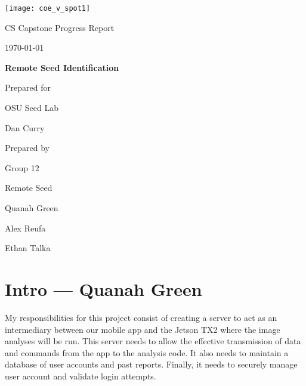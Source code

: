 \documentclass[onecolumn, draftclsnofoot,10pt, compsoc]{IEEEtran}
\def \CapstoneTeamName{		Remote Seed}
\def \CapstoneTeamNumber{		12}
\def \GroupMemberOne{			Quanah Green}
\def \GroupMemberTwo{			Alex Reufa}
\def \GroupMemberThree{			Ethan Talka}
\def \CapstoneProjectName{		Remote Seed Identification}
\def \CapstoneSponsorCompany{	OSU Seed Lab}
\def \CapstoneSponsorPerson{		Dan Curry}
\def \DocType{		%
				Progress Report
				}
\newcommand{\NameSigPair}[1]{\par
\makebox[2.75in][r]{#1} \hfil 	\makebox[3.25in]{\makebox[2.25in]{\hrulefill} \hfill		\makebox[.75in]{\hrulefill}}
\par\vspace{-12pt} \textit{\tiny\noindent
\makebox[2.75in]{} \hfil		\makebox[3.25in]{\makebox[2.25in][r]{Signature} \hfill	\makebox[.75in][r]{Date}}}}
\renewcommand{\NameSigPair}[1]{#1}
\begin{document}
\begin{titlepage}
    \begin{singlespace}
    	\texttt{[image: coe\_v\_spot1]}
        \hfill 
        \par\vspace{.2in}
        \centering
        \scshape{
            \huge CS Capstone \DocType \par
            {\large\today}\par
            \vspace{.5in}
            \textbf{\Huge\CapstoneProjectName}\par
            \vfill
            {\large Prepared for}\par
            \Huge \CapstoneSponsorCompany\par
            \vspace{5pt}
            {\Large\NameSigPair{\CapstoneSponsorPerson}\par}
            {\large Prepared by }\par
            Group\CapstoneTeamNumber\par
            \CapstoneTeamName\par 
            \vspace{5pt}
            {\Large
                \NameSigPair{\GroupMemberOne}\par
                \NameSigPair{\GroupMemberTwo}\par
                \NameSigPair{\GroupMemberThree}\par
            }
            \vspace{20pt}
        }
        \begin{abstract}

        \end{abstract}     
    \end{singlespace}
\end{titlepage}
\newpage
{}
\tableofcontents
\clearpage


\section{Intro --- Quanah Green}
My responsibilities for this project consist of creating a server to act as an intermediary between our mobile app and the Jetson TX2 where the image analyses will be run.
This server needs to allow the effective transmission of data and commands from the app to the analysis code.
It also needs to maintain a database of user accounts and past reports.
Finally, it needs to securely manage user account and validate login attempts.
\end{document}
